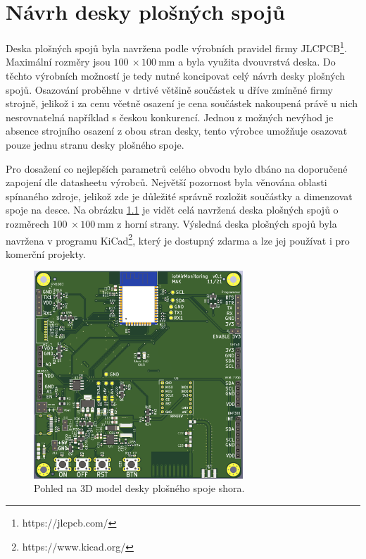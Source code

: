 \chapter{Návrh desky plošných spojů}

Deska plošných spojů byla navržena podle výrobních pravidel firmy JLCPCB\footnote{https://jlcpcb.com/}. Maximální rozměry jsou $\SI{100}{}\times \SI{100}{\milli\metre}$ a byla využita dvouvrstvá deska. Do těchto výrobních možností je tedy nutné koncipovat celý návrh desky plošných spojů. Osazování proběhne v drtivé většině součástek u dříve zmíněné firmy strojně, jelikož i za cenu včetně osazení je cena součástek nakoupená právě u nich nesrovnatelná například s českou konkurencí. Jednou z možných nevýhod je absence strojního osazení z obou stran desky, tento výrobce umožňuje osazovat pouze jednu stranu desky plošného spoje.

Pro dosažení co nejlepších parametrů celého obvodu bylo dbáno na doporučené zapojení dle datasheetu výrobců. Největší pozornost byla věnována oblasti spínaného zdroje, jelikož zde je důležité správně rozložit součástky a dimenzovat spoje na desce. Na obrázku \ref{fig_PCB-top} je vidět celá navržená deska plošných spojů o rozměrech $\SI{100}{}\times \SI{100}{\milli\metre}$ z horní strany. Výsledná deska plošných spojů byla navržena v programu KiCad\footnote{https://www.kicad.org/}, který je dostupný zdarma a lze jej používat i pro komerční projekty.

\begin{figure}[h]
    \centering
    \includegraphics[width=0.7\textwidth]{obrazky/PCB_top.png}
    \caption{Pohled na 3D model desky plošného spoje shora.}
    \label{fig_PCB-top}
\end{figure}